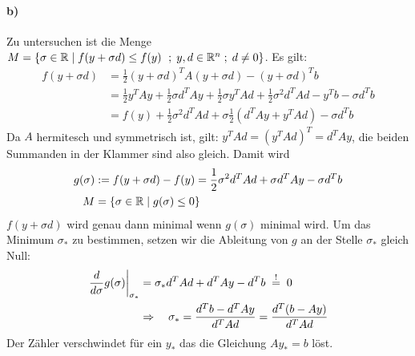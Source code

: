 \paragraph*{b)}
Zu untersuchen ist die Menge $M = \{\sigma \in \mathbb R \mid f(y + \sigma d) \le f(y)\ \;;\; y, d \in \mathbb R^n \;;\; d \ne 0 \}$. Es gilt:
\begin{align*}
  f(y + \sigma d) & = \frac{1}{2} (y + \sigma d)^T A (y + \sigma d) - (y + \sigma d)^T b\\
  & =   \frac{1}{2}y^TA y  + \frac{1}{2}\sigma d^T A y + \frac{1}{2}\sigma y^T A d
      + \frac{1}{2} \sigma^2 d^T A d - y^T b - \sigma d^T b\\
  & = f(y) + \frac{1}{2} \sigma^2 d^T A d + \sigma \frac{1}{2} (d^T A y
      + y^T A d) - \sigma d^T b
\end{align*}
Da $A$ hermitesch und symmetrisch ist, gilt: $y^T A d = (y^T A d )^T = d^T A y$,
die beiden Summanden in der Klammer sind also gleich. Damit wird
\begin{align*}
 g(\sigma) & := f(y + \sigma d) - f(y) = \frac{1}{2} \sigma^2 d^T A d  + \sigma d^T A y -  \sigma d^T b\\
 M & = \{\sigma \in \mathbb R \mid  g(\sigma) \le 0\}
\end{align*}
$f(y + \sigma d)$ wird genau dann minimal wenn $g(\sigma)$ minimal wird.
Um das Minimum $\sigma_*$ zu bestimmen, setzen wir die Ableitung von $g$
an der Stelle $\sigma_*$ gleich Null:
\begin{align*}
  \left. \frac{d}{d \sigma} g(\sigma) \right|_{\sigma_*}
  &= \sigma_* d^T A d + d^T A y - d^T b\;\overset{!}{=} \; 0 \\
  & \Rightarrow \quad \sigma_* = \frac{d^T b - d^T A y} {d^T A d}
  =  \frac{d^T (b - A y)} {d^T A d}
\end{align*}
Der Zähler verschwindet für ein $y_*$ das die Gleichung $A y_* = b$ löst.




